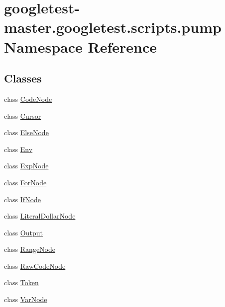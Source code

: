 \hypertarget{namespacegoogletest-master_1_1googletest_1_1scripts_1_1pump}{}\section{googletest-\/master.googletest.\+scripts.\+pump Namespace Reference}
\label{namespacegoogletest-master_1_1googletest_1_1scripts_1_1pump}
\subsection*{Classes}
\begin{DoxyCompactItemize}
\item 
class \mbox{\hyperlink{classgoogletest-master_1_1googletest_1_1scripts_1_1pump_1_1_code_node}{Code\+Node}}
\item 
class \mbox{\hyperlink{classgoogletest-master_1_1googletest_1_1scripts_1_1pump_1_1_cursor}{Cursor}}
\item 
class \mbox{\hyperlink{classgoogletest-master_1_1googletest_1_1scripts_1_1pump_1_1_else_node}{Else\+Node}}
\item 
class \mbox{\hyperlink{classgoogletest-master_1_1googletest_1_1scripts_1_1pump_1_1_env}{Env}}
\item 
class \mbox{\hyperlink{classgoogletest-master_1_1googletest_1_1scripts_1_1pump_1_1_exp_node}{Exp\+Node}}
\item 
class \mbox{\hyperlink{classgoogletest-master_1_1googletest_1_1scripts_1_1pump_1_1_for_node}{For\+Node}}
\item 
class \mbox{\hyperlink{classgoogletest-master_1_1googletest_1_1scripts_1_1pump_1_1_if_node}{If\+Node}}
\item 
class \mbox{\hyperlink{classgoogletest-master_1_1googletest_1_1scripts_1_1pump_1_1_literal_dollar_node}{Literal\+Dollar\+Node}}
\item 
class \mbox{\hyperlink{classgoogletest-master_1_1googletest_1_1scripts_1_1pump_1_1_output}{Output}}
\item 
class \mbox{\hyperlink{classgoogletest-master_1_1googletest_1_1scripts_1_1pump_1_1_range_node}{Range\+Node}}
\item 
class \mbox{\hyperlink{classgoogletest-master_1_1googletest_1_1scripts_1_1pump_1_1_raw_code_node}{Raw\+Code\+Node}}
\item 
class \mbox{\hyperlink{classgoogletest-master_1_1googletest_1_1scripts_1_1pump_1_1_token}{Token}}
\item 
class \mbox{\hyperlink{classgoogletest-master_1_1googletest_1_1scripts_1_1pump_1_1_var_node}{Var\+Node}}
\end{DoxyCompactItemize}
